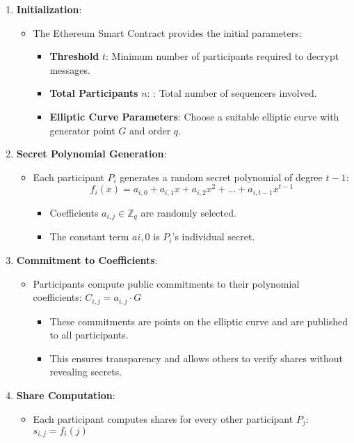 \begin{enumerate}
	\item \textbf{Initialization}:
			\begin{itemize}
				\item The Ethereum Smart Contract provides the initial parameters:
						\begin{itemize}
							\item \textbf{Threshold} $t$: Minimum number of participants required to decrypt messages.
							\item \textbf{Total Participants} $n$: : Total number of sequencers involved.
							\item \textbf{Elliptic Curve Parameters}: Choose a suitable elliptic curve with generator point $G$ and order $q$.
						\end{itemize}
			\end{itemize}
	\item \textbf{Secret Polynomial Generation}:
			\begin{itemize}
				\item Each participant $P_i$ generates a random secret polynomial of degree $t-1$:
						$$f_i (x) = a_{i,0} + a_{i, 1}x + a_{i,2}x^2 + \dots + a_{i, t-1}x^{t-1}$$
						\begin{itemize}
							\item Coefficients $a_{i,j} \in \mathbb{Z}_q$ are randomly selected.
							\item The constant term $a{i,0}$ is $P_i$'s individual secret.
						\end{itemize}
			\end{itemize}
	\item \textbf{Commitment to Coefficients}:
			\begin{itemize}
				\item Participants compute public commitments to their polynomial coefficients: $C_{i,j} = a_{i,j}\cdot G$
					\begin{itemize}
						\item These commitments are points on the elliptic curve and are published to all participants.
						\item This ensures transparency and allows others to verify shares without revealing secrets.
					\end{itemize}
			\end{itemize}
	\item \textbf{Share Computation}:
			\begin{itemize}
				\item Each participant computes shares for every other participant  $P_j$: $s_{i,j} = f_i(j)$

\end{itemize}
\end{enumerate}

